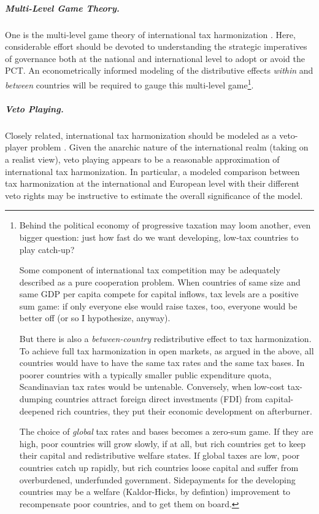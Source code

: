 \subparagraph{Multi-Level Game Theory.} One is the multi-level game theory of international tax harmonization \citep{Scharpf-1997-aa}. Here, considerable effort should be devoted to understanding the strategic imperatives of governance both at the national and international level to adopt or avoid the PCT. An econometrically informed modeling of the distributive effects \emph{within} and \emph{between} countries will be required to gauge this multi-level game\footnote{Behind the political economy of progressive taxation may loom another, even bigger question: just how fast do we want developing, low-tax countries to play catch-up?

Some component of international tax competition may be adequately described as a pure cooperation problem. When countries of same size and same GDP per capita compete for capital inflows, tax levels are a positive sum game: if only everyone else would raise taxes, too, everyone would be better off (or so I hypothesize, anyway).

But there is also a \emph{between-country} redistributive effect to tax harmonization. To achieve full tax harmonization in open markets, as argued in the above, all countries would have to have the same tax rates and the same tax bases. In poorer countries with a typically smaller public expenditure quota, Scandinavian tax rates would be untenable. Conversely, when low-cost tax-dumping countries attract foreign direct investments (FDI) from capital-deepened rich countries, they put their economic development on afterburner. 

The choice of \emph{global} tax rates and bases becomes a zero-sum game. If they are high, poor countries will grow slowly, if at all, but rich countries get to keep their capital and redistributive welfare states. If global taxes are low, poor countries catch up rapidly, but rich countries loose capital and suffer from overburdened, underfunded government. Sidepayments for the developing countries may be a welfare (Kaldor-Hicks, by defintion) improvement to recompensate poor countries, and to get them on board.}.

\subparagraph{Veto Playing.} Closely related, international tax harmonization should be modeled as a veto-player problem \citep{Tsebelis-2002-aa}. Given the anarchic nature of the international realm (taking on a realist view), veto playing appears to be a reasonable approximation of international tax harmonization. In particular, a modeled comparison between tax harmonization at the international and European level with their different veto rights may be instructive to estimate the overall significance of the model.

